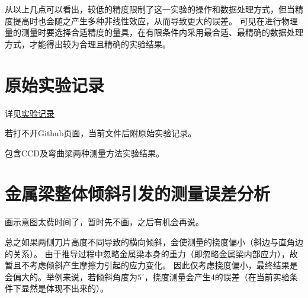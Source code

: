 \documentclass[12pt, a4paper]{ctexart}
\begin{document}
从以上几点可以看出，较低的精度限制了这一实验的操作和数据处理方式，但当精度提高时也会随之产生多种非线性效应，从而导致更大的误差。
可见在进行物理量的测量时要选择合适精度的量具，在有限条件内采用最合适、最精确的数据处理方式，才能得出较为合理且精确的实验结果。

\appendix
\section{原始实验记录}
详见\href{https://github.com/oFtangcY/-/blob/main/1.8%E6%9D%A8%E6%B0%8F%E6%A8%A1%E9%87%8F/origin%20data.pdf}{实验记录}

若打不开Github页面，当前文件后附原始实验记录。

包含CCD及弯曲梁两种测量方法实验结果。

\section{金属梁整体倾斜引发的测量误差分析}
\label{appendix:附录B}
画示意图太费时间了，暂时先不画，之后有机会再说。

总之如果两侧刀片高度不同导致的横向倾斜，会使测量的挠度偏小（斜边与直角边的关系）。
由于推导过程中忽略金属梁本身的重力（即忽略金属梁内部应力），故暂且不考虑倾斜产生摩擦力引起的应力变化。
因此仅考虑挠度偏小，最终结果是会偏大的。举例来说，若倾斜角度为$5^\circ$，挠度测量会产生4\textperthousand 的误差（在当前实验条件下显然是体现不出来的）。
\end{document}
